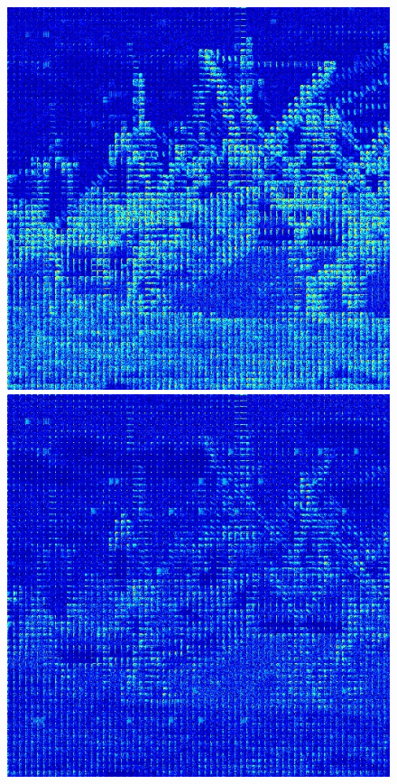\documentclass[12pt]{report}
\begin{document}
\begin{figure}[H]
\begin{center}
\includegraphics[scale=0.25]{../ImageRes/blockdct_0.jpg} 
\includegraphics[scale=0.25]{../ImageRes/blockdct_1.jpg} 

\end{center}
\end{figure}
\end{document}

